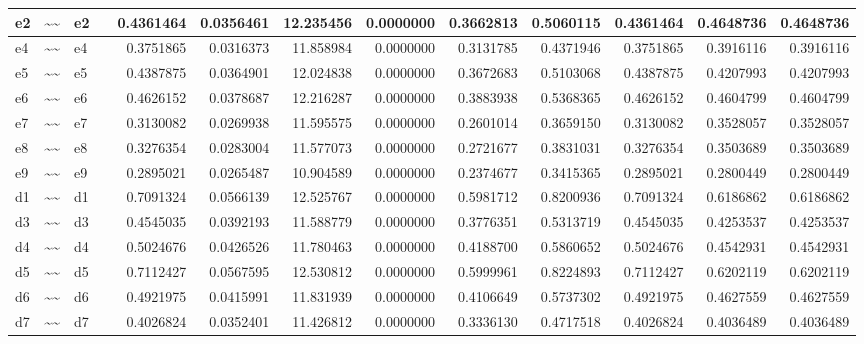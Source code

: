 \documentclass[
  super,
  preprint,
  3p]{elsarticle}
\begin{document}
\begin{tabular}{l|l|l|l|r|r|r|r|r|r|r|r|r}
\hline
e2 & \textasciitilde{}\textasciitilde{} & e2 &  & 0.4361464 & 0.0356461 & 12.235456 & 0.0000000 & 0.3662813 & 0.5060115 & 0.4361464 & 0.4648736 & 0.4648736\\
\hline
e4 & \textasciitilde{}\textasciitilde{} & e4 &  & 0.3751865 & 0.0316373 & 11.858984 & 0.0000000 & 0.3131785 & 0.4371946 & 0.3751865 & 0.3916116 & 0.3916116\\
\hline
e5 & \textasciitilde{}\textasciitilde{} & e5 &  & 0.4387875 & 0.0364901 & 12.024838 & 0.0000000 & 0.3672683 & 0.5103068 & 0.4387875 & 0.4207993 & 0.4207993\\
\hline
e6 & \textasciitilde{}\textasciitilde{} & e6 &  & 0.4626152 & 0.0378687 & 12.216287 & 0.0000000 & 0.3883938 & 0.5368365 & 0.4626152 & 0.4604799 & 0.4604799\\
\hline
e7 & \textasciitilde{}\textasciitilde{} & e7 &  & 0.3130082 & 0.0269938 & 11.595575 & 0.0000000 & 0.2601014 & 0.3659150 & 0.3130082 & 0.3528057 & 0.3528057\\
\hline
e8 & \textasciitilde{}\textasciitilde{} & e8 &  & 0.3276354 & 0.0283004 & 11.577073 & 0.0000000 & 0.2721677 & 0.3831031 & 0.3276354 & 0.3503689 & 0.3503689\\
\hline
e9 & \textasciitilde{}\textasciitilde{} & e9 &  & 0.2895021 & 0.0265487 & 10.904589 & 0.0000000 & 0.2374677 & 0.3415365 & 0.2895021 & 0.2800449 & 0.2800449\\
\hline
d1 & \textasciitilde{}\textasciitilde{} & d1 &  & 0.7091324 & 0.0566139 & 12.525767 & 0.0000000 & 0.5981712 & 0.8200936 & 0.7091324 & 0.6186862 & 0.6186862\\
\hline
d3 & \textasciitilde{}\textasciitilde{} & d3 &  & 0.4545035 & 0.0392193 & 11.588779 & 0.0000000 & 0.3776351 & 0.5313719 & 0.4545035 & 0.4253537 & 0.4253537\\
\hline
d4 & \textasciitilde{}\textasciitilde{} & d4 &  & 0.5024676 & 0.0426526 & 11.780463 & 0.0000000 & 0.4188700 & 0.5860652 & 0.5024676 & 0.4542931 & 0.4542931\\
\hline
d5 & \textasciitilde{}\textasciitilde{} & d5 &  & 0.7112427 & 0.0567595 & 12.530812 & 0.0000000 & 0.5999961 & 0.8224893 & 0.7112427 & 0.6202119 & 0.6202119\\
\hline
d6 & \textasciitilde{}\textasciitilde{} & d6 &  & 0.4921975 & 0.0415991 & 11.831939 & 0.0000000 & 0.4106649 & 0.5737302 & 0.4921975 & 0.4627559 & 0.4627559\\
\hline
d7 & \textasciitilde{}\textasciitilde{} & d7 &  & 0.4026824 & 0.0352401 & 11.426812 & 0.0000000 & 0.3336130 & 0.4717518 & 0.4026824 & 0.4036489 & 0.4036489\\

\end{tabular}
\end{document}
